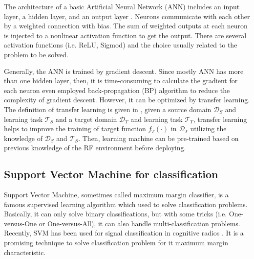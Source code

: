 \documentclass[journal]{IEEEtran}
\begin{document}
The architecture of a basic Artificial Neural Network (ANN) includes an input layer, a hidden layer, and an output layer \cite{schalkoff1997artificial}. Neurons communicate with each other by a weighted connection with bias. The sum of weighted outputs at each neuron is injected to a nonlinear activation function to get the output. There are several activation functions (i.e. ReLU, Sigmod) and the choice usually related to the problem to be solved.

Generally, the ANN is trained by gradient descent. Since mostly ANN has more than one hidden layer, then, it is time-consuming to calculate the gradient for each neuron even employed back-propagation (BP) algorithm to reduce the complexity of gradient descent. However, it can be optimized by transfer learning. The definition of transfer learning is given in \cite{pan2010survey}, given a source domain $\mathcal D_S$ and learning task $\mathcal T_S$ and a target domain $\mathcal D_T $ and learning task $\mathcal T_T$, transfer learning helps to improve the training of target function $f_T(\cdot)$ in $\mathcal D_T $ utilizing the knowledge of $\mathcal D_S$ and $\mathcal T_S$. Then, learning machine can be pre-trained based on previous knowledge of the RF environment before deploying.

\subsection{Support Vector Machine for classification}
Support Vector Machine, sometimes called maximum margin classifier, is a famous supervised learning algorithm which used to solve classification problems. Basically, it can only solve binary classifications, but with some tricks (i.e. One-versus-One or One-versus-All), it can also handle multi-classification problems. Recently, SVM has been used for signal classification in cognitive radios \cite{hu2008signal}. It is a promising technique to solve classification problem for it maximum margin characteristic.
\end{document}
